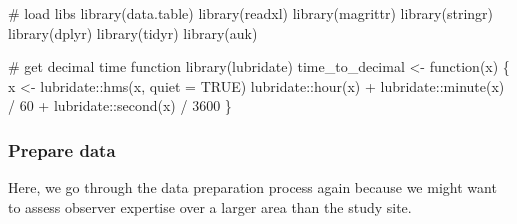 \documentclass[]{article}
\newenvironment{Shaded}{}{}
\newcommand{\CommentTok}[1]{\textcolor[rgb]{0.00,0.50,0.00}{#1}}
\newcommand{\ControlFlowTok}[1]{\textcolor[rgb]{0.00,0.00,1.00}{#1}}
\newcommand{\DataTypeTok}[1]{#1}
\newcommand{\DecValTok}[1]{#1}
\newcommand{\KeywordTok}[1]{\textcolor[rgb]{0.00,0.00,1.00}{#1}}
\newcommand{\NormalTok}[1]{#1}
\newcommand{\OperatorTok}[1]{#1}
\newcommand{\OtherTok}[1]{\textcolor[rgb]{1.00,0.25,0.00}{#1}}
\newcommand{\StringTok}[1]{\textcolor[rgb]{0.00,0.50,0.50}{#1}}
\begin{document}
\begin{Shaded}
\begin{Highlighting}[]

\CommentTok{# load libs}
\KeywordTok{library}\NormalTok{(data.table)}
\KeywordTok{library}\NormalTok{(readxl)}
\KeywordTok{library}\NormalTok{(magrittr)}
\KeywordTok{library}\NormalTok{(stringr)}
\KeywordTok{library}\NormalTok{(dplyr)}
\KeywordTok{library}\NormalTok{(tidyr)}
\KeywordTok{library}\NormalTok{(auk)}

\CommentTok{# get decimal time function}
\KeywordTok{library}\NormalTok{(lubridate)}
\NormalTok{time_to_decimal <-}\StringTok{ }\ControlFlowTok{function}\NormalTok{(x) \{}
\NormalTok{  x <-}\StringTok{ }\NormalTok{lubridate}\OperatorTok{::}\KeywordTok{hms}\NormalTok{(x, }\DataTypeTok{quiet =} \OtherTok{TRUE}\NormalTok{)}
\NormalTok{  lubridate}\OperatorTok{::}\KeywordTok{hour}\NormalTok{(x) }\OperatorTok{+}\StringTok{ }\NormalTok{lubridate}\OperatorTok{::}\KeywordTok{minute}\NormalTok{(x) }\OperatorTok{/}\StringTok{ }\DecValTok{60} \OperatorTok{+}\StringTok{ }\NormalTok{lubridate}\OperatorTok{::}\KeywordTok{second}\NormalTok{(x) }\OperatorTok{/}\StringTok{ }\DecValTok{3600}
\NormalTok{\}}
\end{Highlighting}
\end{Shaded}

\hypertarget{prepare-data}{%
\subsubsection{Prepare data}\label{prepare-data}}

Here, we go through the data preparation process again because we might want to assess observer expertise over a larger area than the study site.
\end{document}
